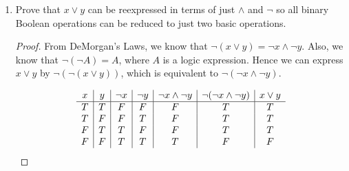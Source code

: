 \documentclass[12pt]{article}
\begin{document}
\begin{enumerate}
	\begin{proof}
			\begin{displaymath}
			\begin{array}{c|c|c| c| c|c|c|c|c|c}
				x & y & x \lor T&\lnot (x \land y)& \lnot x \lor y& \lnot x&x \lor \lnot y&\lnot y& (x\land y) \lor (\lnot x\land \lnot y)	&\lnot (x \lor y)\\ 
				\hline  
				T & T &T &F & T &F&T&F&T&F\\
				T & F & T&T& F &F&T&T&F&F\\
				F & T &T&T& T &T&F&F&F&F\\
				F & F & T&T&T &T&T&T&T&T\\
			\end{array}	
		\end{displaymath}
		Noticing that eight possible results are listed in the truth table above, we can simply add not operation in front of all eight of them and express another eight. Since there is no identical combinations and all operations have $X$ false and $Y$ false as true, by adding the not operation to flip the results, the other eight binary combinations has to be distinct as well(with operations that will express all $X$ false and $Y$ false as false). Therefore, there will be 16 different combinations expressed. We proved in the last problem that there are 16 possible combinations in total and hence we found ways to express all of them only uses basic opertions.
		
		  
		  
		  
		 
	\end{proof}
	
	
	
	
	
	
	
	\item
	Prove that $x \lor y$ can be reexpressed in terms of just $\land$ and $\lnot$ so all binary Boolean operations can be reduced to just two basic operations. \\
	\begin{proof}
	From DeMorgan’s Laws, we know that $\lnot (x \lor y) = \lnot x \land \lnot y$. Also, we know that $\lnot (\lnot A) = A$, where $A$ is a logic expression. Hence we can express $x \lor y$ by $\lnot(\lnot (x \lor y))$, which is equivalent to  $\lnot ( \lnot x \land \lnot y)$.

			\begin{displaymath}
			\begin{array}{c| c| c|c|c|c|c}
				x & y & \lnot x &\lnot y& \lnot x \land \lnot y & \lnot ( \lnot x \land \lnot y )& x \lor y\\
				\hline  
				T & T &F&F&F&T&T\\
				T & F &F&T&F&T&T\\
				F & T &T&F&F&T&T\\
				F & F &T&T&T&F&F\\
			\end{array}	
		\end{displaymath}


\end{proof}
\end{enumerate}
\end{document}
